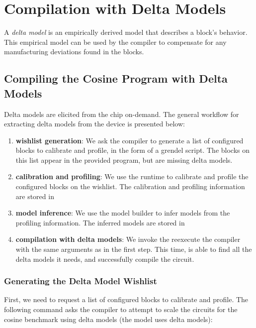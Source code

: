 \chapter{Compilation with Delta Models}

A \textit{delta model} is an empirically derived model that describes a block's
behavior. This empirical model can be used by the compiler to compensate for any
manufacturing deviations found in the blocks.

\section{Compiling the Cosine Program with Delta Models}

Delta models are elicited from the chip on-demand. The general workflow for
extracting delta models from the device is presented below:

\begin{enumerate}
\item \textbf{wishlist generation}: We ask the \legno compiler to generate a list of configured
  blocks to calibrate and profile, in the form of a grendel script. The blocks
  on this list appear in the provided program, but are missing delta models.
\item \textbf{calibration and profiling}: We use the \grendel runtime to
  calibrate and profile the configured blocks on the wishlist. The calibration
  and profiling information are stored in 
\item \textbf{model inference}: We use the model builder to infer models from
  the profiling information. The inferred models are stored in 
\item \textbf{compilation with delta models}: We invoke the reexecute the \legno
  compiler with the same arguments as in the first step. This time, \legno
  is able to find all the delta models it needs, and successfully compile the circuit.
  
\end{enumerate}


\subsection{Generating the Delta Model Wishlist}

First, we need to request a list of configured blocks to calibrate and profile.
The following command asks the compiler to attempt to scale the circuits for the
cosine benchmark using delta models (the  model uses delta models): 

